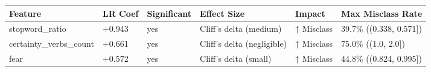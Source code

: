 \begin{tabular}{llllll}
\toprule
Feature & LR Coef & Significant & Effect Size & Impact & Max Misclass Rate \\
\midrule
stopword\_ratio & +0.943 & yes & Cliff's delta (medium) & ↑ Misclass & 39.7\% ((0.338, 0.571]) \\
certainty\_verbs\_count & +0.661 & yes & Cliff's delta (negligible) & ↑ Misclass & 75.0\% ((1.0, 2.0]) \\
fear & +0.572 & yes & Cliff's delta (small) & ↑ Misclass & 44.8\% ((0.824, 0.995]) \\
\bottomrule
\end{tabular}

